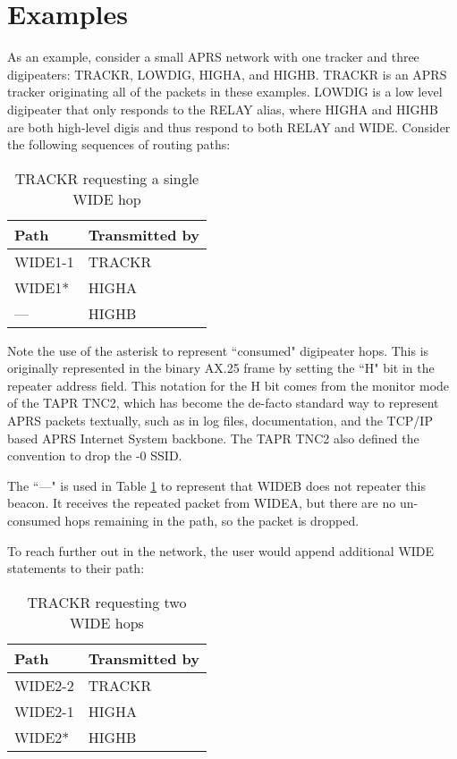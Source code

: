 \section{Examples}

As an example, consider a small APRS network with one tracker and three
digipeaters: TRACKR, LOWDIG, HIGHA, and HIGHB.
TRACKR is an APRS tracker originating all of the packets in these examples.
LOWDIG is a low level digipeater that only responds to the RELAY alias, 
where HIGHA and HIGHB are both high-level digis and thus respond to
both RELAY and WIDE.
Consider the following sequences of routing paths:
\begin{table}[!h]
	\centering
	\begin{tabular}{ | l | l | }
		\hline
		Path & Transmitted by \\ \hline
		WIDE1-1 & TRACKR \\ \hline
		WIDE1* & HIGHA \\ \hline
		--- & HIGHB \\ \hline
	\end{tabular}
	\caption{TRACKR requesting a single WIDE hop}
	\label{tab:singlewide}
\end{table}

Note the use of the asterisk to represent ``consumed" digipeater hops.
This is originally represented in the binary AX.25 frame
by setting the ``H" bit in the repeater address field.
This notation for the H bit comes from the monitor mode
of the TAPR TNC2, which has become the de-facto standard way to represent
APRS packets textually, such as in log files, documentation, and the
TCP/IP based APRS Internet System backbone.
The TAPR TNC2 also defined the convention to drop the -0 SSID.

The ``---" is used in Table \ref{tab:singlewide} to represent that WIDEB does not
repeater this beacon.
It receives the repeated packet from WIDEA, but there are no un-consumed
hops remaining in the path, so the packet is dropped.

To reach further out in the network, the user would append additional WIDE statements to their path:
\begin{table}[!h]
	\centering
	\begin{tabular}{ | l | l | }
		\hline
		Path & Transmitted by \\ \hline
		WIDE2-2 & TRACKR \\ \hline
		WIDE2-1 & HIGHA \\ \hline
		WIDE2* & HIGHB \\ \hline
	\end{tabular}
	\caption{TRACKR requesting two WIDE hops}
	\label{tab:twowide}
\end{table}

